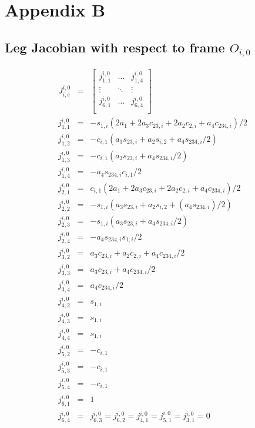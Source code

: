 \chapter*{Appendix B}
	\section*{Leg Jacobian with respect to frame $O_{i,0}$}
	\begin{eqnarray*}
		J^{i,0}_{i,e} &=& 
		\left[
			\begin{array}{ccc}
				j_{1,1}^{i,0}	& \ldots 		& j_{1,4}^{i,0} 	\\
				\vdots 			& \ddots 		& \vdots 			\\
				j_{6,1}^{i,0}	& \ldots 	 	& j_{6,4}^{i,0} 	\\
			\end{array}
		\right]\\
		j_{1,1}^{i,0} &=& -s_{1,i} (2 a_{1} + 2 a_{3} c_{23,i} + 2 a_{2} c_{2,i} + a_{4} c_{234,i})/2\nonumber\\
		j_{1,2}^{i,0} &=& -c_{i,1} (a_{3} s_{23,i} + a_{2} s_{i,2} + a_{4} s_{234,i}/2)				\nonumber\\
		j_{1,3}^{i,0} &=& -c_{i,1} (a_{3} s_{23,i} + a_{4} s_{234,i}/2)								\nonumber\\
		j_{1,4}^{i,0} &=& -a_{4} s_{234,i} c_{i,1}/2 												\nonumber\\
		j_{2,1}^{i,0} &=& c_{i,1} (2 a_{1} + 2 a_{3} c_{23,i} + 2 a_{2} c_{2,i} + a_{4} c_{234,i})/2\nonumber\\
		j_{2,2}^{i,0} &=& -s_{1,i} (a_{3} s_{23,i} + a_{2} s_{i,2} + (a_{4} s_{234,i})/2)				\nonumber\\
		j_{2,3}^{i,0} &=& -s_{1,i} (a_{3} s_{23,i} + a_{4} s_{234,i}/2)								\nonumber\\
		j_{2,4}^{i,0} &=& -a_{4} s_{234,i} s_{1,i}/2 												\nonumber\\
		j_{3,2}^{i,0} &=& a_{3} c_{23,i} + a_{2} c_{2,i} + a_{4} c_{234,i}/2						\nonumber\\
		j_{3,3}^{i,0} &=& a_{3} c_{23,i} + a_{4} c_{234,i}/2										\nonumber\\
		j_{3,4}^{i,0} &=& a_{4} c_{234,i}/2 														\nonumber\\
		j_{4,2}^{i,0} &=& s_{1,i}																		\nonumber\\
		j_{4,3}^{i,0} &=& s_{1,i}																		\nonumber\\
		j_{4,4}^{i,0} &=& s_{1,i}																		\nonumber\\
		j_{5,2}^{i,0} &=& -c_{i,1}																	\nonumber\\
		j_{5,3}^{i,0} &=& -c_{i,1}																	\nonumber\\
		j_{5,4}^{i,0} &=& -c_{i,1}																	\nonumber\\
		j_{6,1}^{i,0} &=& 1																			\nonumber\\
		j_{6,4}^{i,0} &=& j_{6,3}^{i,0} = j_{6,2}^{i,0} = j_{4,1}^{i,0} = j_{5,1}^{i,0} = j_{3,1}^{i,0} = 0															\nonumber\\
		\label{eq::leg_jacobian}
	\end{eqnarray*}